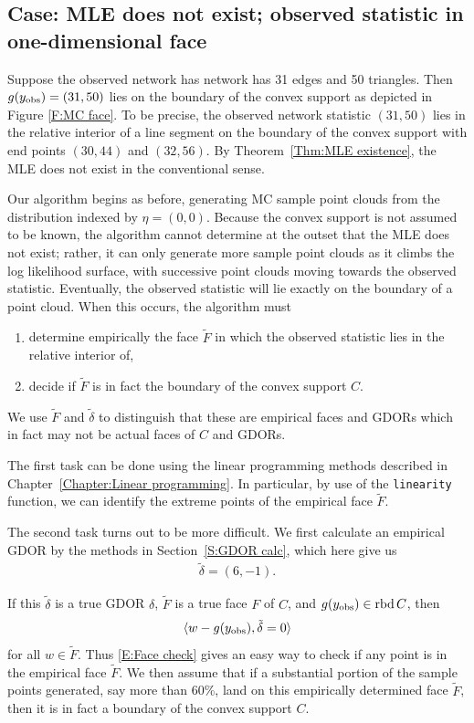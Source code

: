 \subsection{Case: MLE does not exist; observed statistic in one-dimensional face}
Suppose the observed network has network has 31 edges and 50 triangles.  Then 
$g(y_{\text{obs}}) = (31,50)$ lies on the boundary of the convex support as depicted in 
Figure \ref{F:MC face}.  To be precise, the observed network statistic $(31,50)$ lies 
in the relative interior of a line segment on the boundary of the convex support with 
end points $(30,44)$ and $(32,56)$. 
By Theorem~\ref{Thm:MLE existence}, the MLE does not exist
in the conventional sense.

Our algorithm begins as before, generating MC sample point clouds 
from the distribution indexed by $\eta = (0,0)$.  Because the convex 
support is not assumed to be known, 
the algorithm cannot determine at the outset that the MLE does 
not exist; rather, it can only generate more sample point clouds as it climbs the log 
likelihood surface, with successive point clouds moving towards the observed statistic.
Eventually, the observed statistic will lie exactly on the boundary of a point cloud.
When this occurs, the algorithm must 
\begin{enumerate}
\item determine empirically the face $\tilde{F}$ in which the observed statistic lies in the 
relative interior of,
\item decide if $\tilde{F}$ is in fact the boundary of the convex support $C$.
\end{enumerate}  

We use $\tilde{F}$ and $\tilde{\delta}$ to distinguish that these are empirical
faces and GDORs which in fact may not be actual faces of $C$ and GDORs.

The first task can be done using the linear programming methods 
described in Chapter~\ref{Chapter:Linear programming}.  
In particular, by use of the \texttt{linearity} function, we can identify the 
extreme points of the empirical face $\tilde{F}$.
 

The second task turns out to be more difficult.  
We first calculate an empirical GDOR by the methods in Section~\ref{S:GDOR calc}, which here give us
\begin{align*}
	\tilde{\delta} = (6,-1).
\end{align*}

If this $\tilde{\delta}$ is a true GDOR $\delta$, $\tilde{F}$ is a true face $F$ of $C$, and $g(y_{\text{obs}}) \in \operatorname{rbd} C$, then 
\begin{align} \label{E:Face check}
	\langle w - g(y_{\text{obs}}), \tilde{\delta} = 0  \rangle
\end{align}
for all $w \in \tilde{F}$.  
Thus \eqref{E:Face check} gives an easy way to check if 
any point is in the empirical face $\tilde{F}$.
We then assume that if a substantial portion of the sample points generated, say 
more than 60\%, land on this empirically determined face $\tilde{F}$, then it is in fact 
a boundary of the convex support $C$.  

